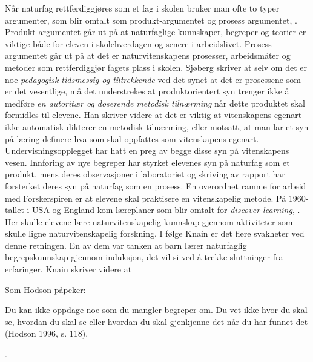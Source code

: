 \documentclass[main.tex]{subfiles}
\begin{document}
Når naturfag rettferdiggjøres som et fag i skolen bruker man ofte to typer argumenter, som blir
omtalt som produkt-argumentet og prosess argumentet, . Produkt-argumentet går ut på at
naturfaglige kunnskaper, begreper og teorier er viktige både for eleven i skolehverdagen og senere i
arbeidslivet. Prosess-argumentet går ut på at det er naturvitenskapens prosesser, arbeidsmåter og metoder
som rettferdiggjør fagets plass i skolen. \iffalse \citeauthor{sjob04} \else Sjøberg \fi skriver at selv om det er noe \emph{pedagogisk 
tidsmessig og tiltrekkende} ved det synet at det er prosessene som er det vesentlige, må det understrekes at 
produktorientert syn trenger ikke å medføre \emph{en autoritær og doserende metodisk tilnærming} når dette produktet 
skal formidles til elevene. \iffalse \citeauthor{sjob04} \else Han \fi skriver videre at det er viktig at vitenskapens egenart ikke automatisk 
dikterer en metodisk tilnærming, eller motsatt, at man lar et syn på læring definere hva som skal oppfattes som 
vitenskapens egenart. Undervisningsopplegget har hatt en preg av begge disse syn på vitenskapens vesen. 
Innføring av nye begreper har styrket elevenes syn på naturfag som et produkt, mens deres observasjoner i 
laboratoriet og skriving av rapport har forsterket deres syn på naturfag som en prosess. 
\newline
\newline
En overordnet ramme for arbeid med Forskerspiren er at 
elevene skal praktisere en vitenskapelig metode. På 1960-tallet i USA og England kom læreplaner som blir omtalt
for \emph{discover-learning}, . Her skulle elevene lære naturvitenskapelig kunnskap gjennom aktiviteter som
skulle ligne naturvitenskapelig forskning. I følge \iffalse \citeauthor{knai11} \else Knain \fi  er det flere svakheter ved denne
retningen. En av dem var tanken at barn lærer naturfaglig begrepskunnskap gjennom induksjon, det vil si ved
å trekke sluttninger fra erfaringer. \iffalse \citeauthor{knai11} \else Knain \fi skriver videre at
\begin{displayquote}
Som Hodson påpeker:
\begin{displayquote}
Du kan ikke oppdage noe som du mangler begreper om. Du vet ikke hvor du skal se, hvordan du skal se eller
hvordan du skal gjenkjenne det når du har funnet det (Hodson 1996, s. 118).
\end{displayquote}
\end{displayquote}


.
\end{document}
